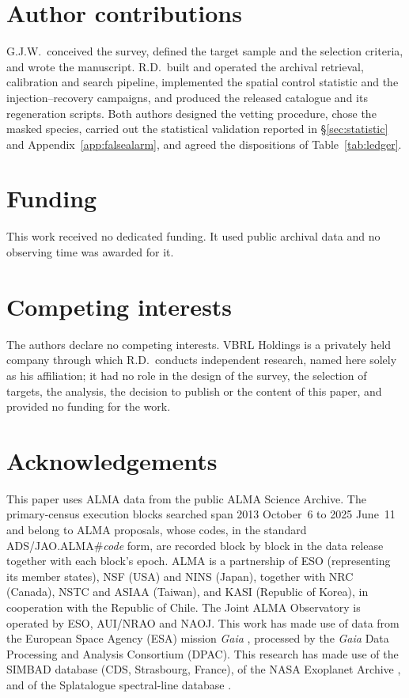 \section*{Author contributions}
G.J.W.\ conceived the survey, defined the target sample and the selection
criteria, and wrote the manuscript. R.D.\ built and operated the archival
retrieval, calibration and search pipeline, implemented the spatial control
statistic and the injection--recovery campaigns, and produced the released
catalogue and its regeneration scripts. Both authors designed the vetting
procedure, chose the masked species, carried out the statistical
validation reported in \S\ref{sec:statistic} and
Appendix~\ref{app:falsealarm}, and agreed the dispositions of
Table~\ref{tab:ledger}.

\section*{Funding}
This work received no dedicated funding. It used public archival data and
no observing time was awarded for it.

\section*{Competing interests}
The authors declare no competing interests. VBRL Holdings is a privately
held company through which R.D.\ conducts independent research, named
here solely as his affiliation; it had no role in the design of the
survey, the selection of targets, the analysis, the decision to publish
or the content of this paper, and provided no funding for the work.

\section*{Acknowledgements}
This paper uses ALMA data from the public ALMA Science Archive. The \NEB{}
primary-census execution blocks searched span 2013 October~6 to 2025
June~11 and belong to \NProjCodes{} ALMA proposals, whose codes, in the
standard ADS/JAO.ALMA\#\textit{code} form, are recorded block by block in
the data release together with each block's
epoch.\ProjCodeUnresClause{} ALMA is a partnership of ESO
(representing its member states), NSF (USA) and NINS (Japan), together with NRC
(Canada), NSTC and ASIAA (Taiwan), and KASI (Republic of Korea), in cooperation
with the Republic of Chile. The Joint ALMA Observatory is operated by ESO,
AUI/NRAO and NAOJ. This work has made use of data from the European Space
Agency (ESA) mission {\it Gaia} \citep{GaiaDR3}, processed by the {\it Gaia}
Data Processing and Analysis Consortium (DPAC). This research has made use
of the SIMBAD database (CDS, Strasbourg, France), of the NASA Exoplanet
Archive \citep{NEA2013}, and of the Splatalogue spectral-line database
\citep{Splatalogue2007}.

